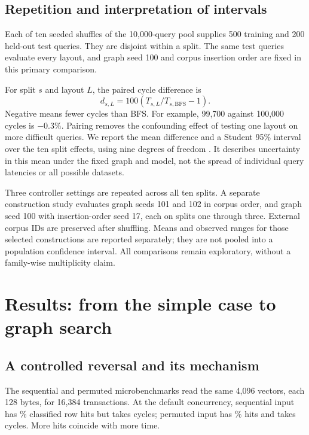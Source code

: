 \documentclass[conference]{IEEEtran}
\begin{document}
\subsection{Repetition and interpretation of intervals}
Each of ten seeded shuffles of the 10,000-query pool supplies 500 training and 200 held-out test queries. They are disjoint within a split. The same test queries evaluate every layout, and graph seed 100 and corpus insertion order are fixed in this primary comparison.

For split $s$ and layout $L$, the paired cycle difference is
\begin{equation}
 d_{s,L}=100\left(T_{s,L}/T_{s,\mathrm{BFS}}-1\right).
\end{equation}
Negative means fewer cycles than BFS. For example, 99,700 against 100,000 cycles is $-0.3\%$. Pairing removes the confounding effect of testing one layout on more difficult queries. We report the mean difference and a Student 95\% interval over the ten split effects, using nine degrees of freedom \cite{student}. It describes uncertainty in this mean under the fixed graph and model, not the spread of individual query latencies or all possible datasets.

Three controller settings are repeated across all ten splits. A separate construction study evaluates graph seeds 101 and 102 in corpus order, and graph seed 100 with insertion-order seed 17, each on splits one through three. External corpus IDs are preserved after shuffling. Means and observed ranges for those selected constructions are reported separately; they are not pooled into a population confidence interval. All comparisons remain exploratory, without a family-wise multiplicity claim.

\section{Results: from the simple case to graph search}
\subsection{A controlled reversal and its mechanism}
The sequential and permuted microbenchmarks read the same 4,096 vectors, each 128 bytes, for 16,384 transactions. At the default concurrency, sequential input has \SequentialHit\% classified row hits but takes \SequentialCycles{} cycles; permuted input has \RandomHit\% hits and takes \RandomCycles{} cycles. More hits coincide with more time.
\end{document}
